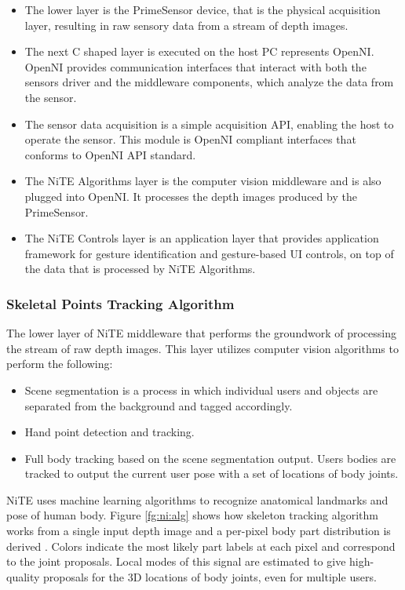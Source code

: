 \begin{itemize}
	\item The lower layer is the PrimeSensor device, that is the physical acquisition layer, resulting in raw sensory data from a stream of depth images. 
	\item The next C shaped layer is executed on the host PC represents OpenNI. OpenNI provides communication interfaces that interact with both the sensors driver and the middleware components, which analyze the data from the sensor. 
	\item The sensor data acquisition is a simple acquisition API, enabling the host to operate the sensor. This module is OpenNI compliant interfaces that conforms to OpenNI API standard. 
	\item The NiTE Algorithms layer is the computer vision middleware and is also plugged into OpenNI. It processes the depth images produced by the PrimeSensor. 
	\item The NiTE Controls layer is an application layer that provides application framework for gesture identification and gesture-based UI controls, on top of the data that is processed by NiTE Algorithms. 
\end{itemize}

\subsubsection{Skeletal Points Tracking Algorithm} The lower layer of NiTE middleware that performs the groundwork of processing the stream of raw depth images. This layer utilizes computer vision algorithms to perform the following: 
\begin{itemize}
	\item Scene segmentation is a process in which individual users and objects are separated from the background and tagged accordingly. 
	\item Hand point detection and tracking. 
	\item Full body tracking based on the scene segmentation output. Users bodies are tracked to output the current user pose with a set of locations of body joints. 
\end{itemize}

NiTE uses machine learning algorithms to recognize anatomical landmarks and pose of human body. Figure \ref{fg:ni:alg} shows how skeleton tracking algorithm works from a single input depth image and a per-pixel body part distribution is derived \cite{13}. Colors indicate the most likely part labels at each pixel and correspond to the joint proposals. Local modes of this signal are estimated to give high-quality proposals for the 3D locations of body joints, even for multiple users.


